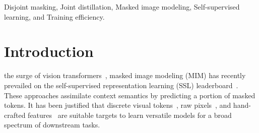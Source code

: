 \documentclass[lettersize,journal]{IEEEtran}
\begin{document}
\begin{IEEEkeywords}
Disjoint masking, Joint distillation, Masked image modeling, Self-supervised learning, and Training efficiency. 
\end{IEEEkeywords}

\section{Introduction}
\label{sec:introduction}
 the surge of vision transformers~\cite{2017arXiv170603762V, 2021arXiv210313915S, liu2021swin, Touvron2021TrainingDI, Touvron2021GoingDW, yuan2021tokens}, masked image modeling (MIM) has recently prevailed on the self-supervised representation learning (SSL) leaderboard~\cite{caron2021emerging,chen2021empirical,2021arXiv210609785L}. These approaches assimilate context semantics by predicting a portion of masked tokens. It has been justified that discrete visual tokens~\cite{2021arXiv210608254B, 2021arXiv211112710D, 2021arXiv211210740E, 2021arXiv211107832Z}, raw pixels~\cite{2021arXiv211106377H, 2021arXiv211109886X}, and hand-crafted features~\cite{2021arXiv211209133W} are suitable targets to learn versatile models for a broad spectrum of downstream tasks.
\end{document}
